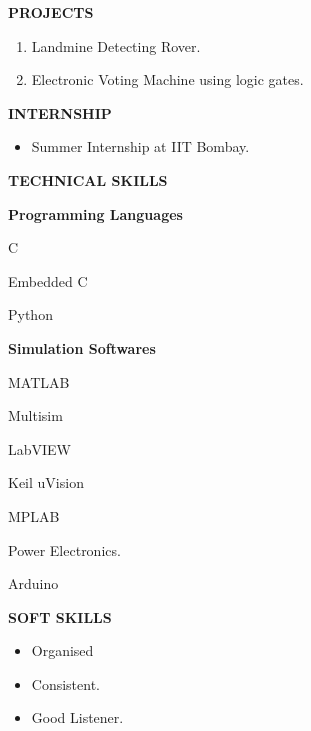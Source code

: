 \documentclass[]{article}
\begin{document}
 
 \begin{flushleft}	                                  
  \vspace{0.15in}
{\large \bf PROJECTS}                                                                 
 \begin{enumerate}	
 \vspace{-0.1in}	                                 
 \addtolength{\itemindent}{1in}
\item  Landmine Detecting Rover.
\item  Electronic Voting Machine using logic gates.
\end{enumerate}
\end{flushleft}


\begin{flushleft}
\vspace{0.15in}
{\large \bf INTERNSHIP}
\begin{itemize}
\hspace{0.5in}
\vspace{-0.22in}
\addtolength{\itemindent}{1in}
\item Summer Internship at IIT Bombay.
\end{itemize}
\end{flushleft}


\begin{flushleft}
\vspace{0.15in}
{\large \bf TECHNICAL SKILLS}
\begin{itemize}
\hspace{0.5in}
{\bf Programming Languages}
{
\addtolength{\itemindent}{1in}
\item C

\item Embedded C
\item Python\
}

\hspace{0.5in}
{\bf Simulation Softwares}
{
\addtolength{\itemindent}{1in}
\item MATLAB
\item Multisim
\item LabVIEW
\item Keil uVision
\item MPLAB


\item Power Electronics.
\item Arduino
}
\end{itemize}
\end{flushleft}


\begin{flushleft}

\vspace{0.15in}
{\large \bf SOFT SKILLS}
\begin{itemize}
\hspace{0.5in}
\vspace{-0.22in}
\addtolength{\itemindent}{1in}
\item Organised
\item Consistent.
\item Good Listener.
\end{itemize}
\end{flushleft}
\end{document}

